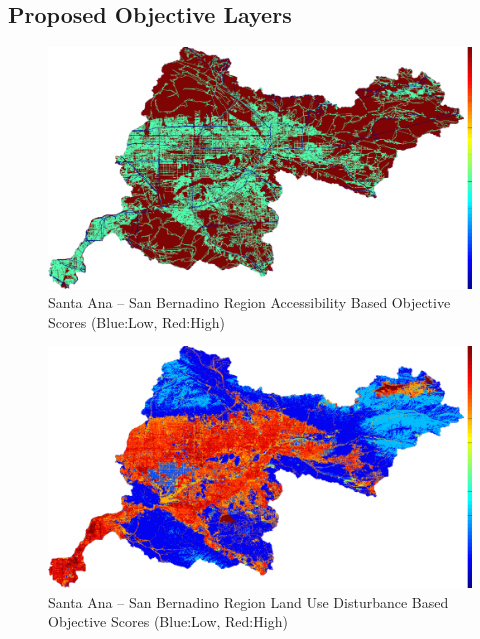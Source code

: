     \subsection{Proposed Objective Layers}

        \begin{figure}[!h]
            \begin{center}
            \includegraphics[width=5.5in]{figures/SanBernadino_AccessibilityScore.png}   
            \caption{Santa Ana -- San Bernadino Region Accessibility Based Objective Scores (Blue:Low, Red:High)}
            \label{fig:SASBaccessibilty}
            \end{center}
        \end{figure}

        \begin{figure}[!h]
            \begin{center}
            \includegraphics[width=5.5in]{figures/SanBernadino_DisturbanceScore.png}   
            \caption{Santa Ana -- San Bernadino Region Land Use Disturbance Based Objective Scores (Blue:Low, Red:High)}
            \label{fig:SASBdisturbance}
            \end{center}
        \end{figure}
        
